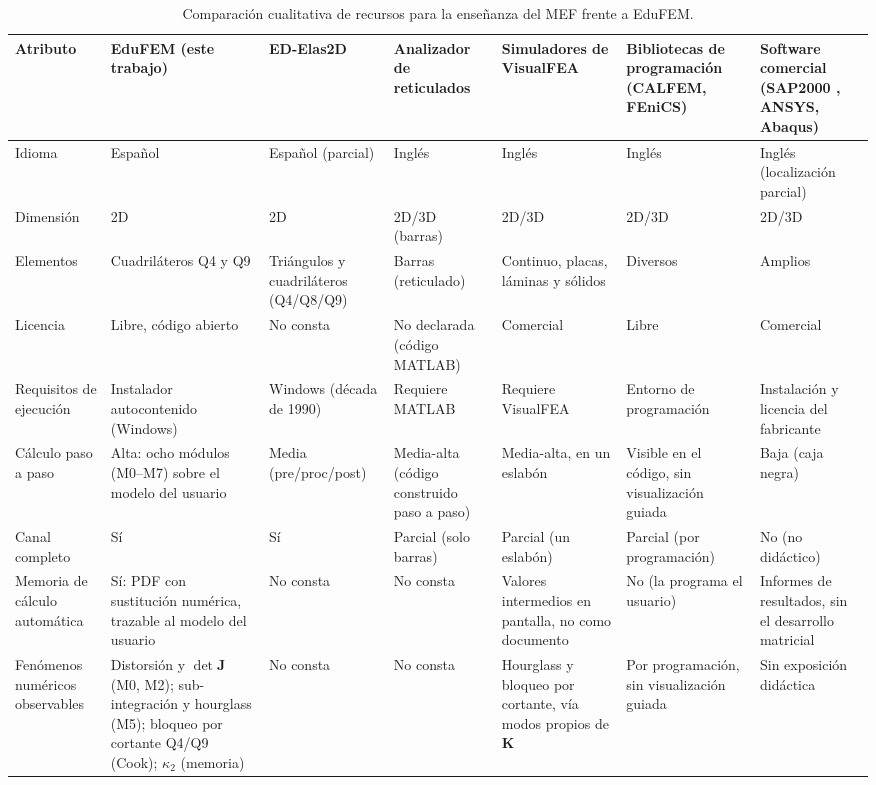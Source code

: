 \begin{table}[htbp]
\centering
\caption[Comparación cualitativa de recursos para la enseñanza del MEF frente a EduFEM.]{Comparación cualitativa de recursos para la enseñanza del MEF frente a EduFEM.}
\label{tab:comparativa}
{\footnotesize
\setlength{\tabcolsep}{2pt}
\renewcommand{\arraystretch}{1.0}
\begin{tabular}{@{}>{\raggedright\arraybackslash}p{2.0cm}>{\raggedright\arraybackslash}p{2.5cm}*{5}{>{\raggedright\arraybackslash}p{2.1cm}}@{}}
\toprule
\textbf{Atributo} & \textbf{EduFEM (este trabajo)} & \textbf{ED-Elas2D} \autocite{suarez1998edelas2d} & \textbf{Analizador de reticulados} \autocite{bishay2020teaching} & \textbf{Simuladores de VisualFEA} \autocite{lee2015interactive,lee2015eigenmodes} & \textbf{Bibliotecas de programación} (CALFEM, FEniCS) & \textbf{Software comercial} (SAP2000 \autocite{csi2017sap2000}, ANSYS, Abaqus) \\
\midrule
Idioma & Español & Español (parcial) & Inglés & Inglés & Inglés & Inglés (localización parcial) \\
Dimensión & 2D & 2D & 2D/3D (barras) & 2D/3D & 2D/3D & 2D/3D \\
Elementos & Cuadriláteros Q4 y Q9 & Triángulos y cuadriláteros (Q4/Q8/Q9) & Barras (reticulado) & Continuo, placas, láminas y sólidos & Diversos & Amplios \\
Licencia & Libre, código abierto & No consta & No declarada (código MATLAB) & Comercial & Libre & Comercial \\
Requisitos de ejecución & Instalador autocontenido (Windows) & Windows (década de 1990) & Requiere MATLAB & Requiere VisualFEA & Entorno de programación & Instalación y licencia del fabricante \\
Cálculo paso a paso & Alta: ocho módulos (M0--M7) sobre el modelo del usuario & Media (pre/proc/post) & Media-alta (código construido paso a paso) & Media-alta, en un eslabón & Visible en el código, sin visualización guiada & Baja (caja negra) \\
Canal completo & Sí & Sí & Parcial (solo barras) & Parcial (un eslabón) & Parcial (por programación) & No (no didáctico) \\
Memoria de cálculo automática & Sí: PDF con sustitución numérica, trazable al modelo del usuario & No consta & No consta & Valores intermedios en pantalla, no como documento & No (la programa el usuario) & Informes de resultados, sin el desarrollo matricial \\
Fenómenos numéricos observables & Distorsión y $\det\bm{J}$ (M0, M2); sub-integración y hourglass (M5); bloqueo por cortante Q4/Q9 (Cook); $\kappa_2$ (memoria) & No consta & No consta & Hourglass y bloqueo por cortante, vía modos propios de $\bm{K}$ & Por programación, sin visualización guiada & Sin exposición didáctica \\

\end{tabular}}
\end{table}

